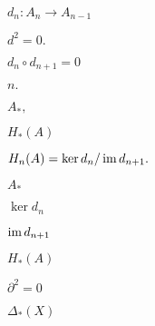 \documentclass[10pt]{book}
\begin{document}
\begin{mdSnippets}
\begin{mdInlineSnippet}[11b6688f633f1839d91ea2501f3293c0]%
$d_n: A_n \to A_{n-1}$\end{mdInlineSnippet}%
\begin{mdInlineSnippet}[a630ae745659559adf449bf608149147]%
$d^2 = 0.$\end{mdInlineSnippet}%
\begin{mdInlineSnippet}[27178de89c53d06da7205800993e6232]%
$d_n \circ d_{n+1} = 0$\end{mdInlineSnippet}%
\begin{mdInlineSnippet}[36cb6ed5283e452800c275dd6934aecc]%
$n.$\end{mdInlineSnippet}%
\begin{mdInlineSnippet}%
$A_*,$\end{mdInlineSnippet}%
\begin{mdInlineSnippet}[a39f07818df5450f4892bfb83a9c660d]%
$H_*(A)$\end{mdInlineSnippet}%
\begin{mdInlineSnippet}[a19203b46a635600ae68ff48045cd88e]%
$H_n(A) = \ker d_n / \operatorname{im} d_{n+1}.$\end{mdInlineSnippet}%
\begin{mdInlineSnippet}[bfb8158d29b977d384fd028bb66c6290]%
$A_*$\end{mdInlineSnippet}%
\begin{mdInlineSnippet}%
$\ker d_n$\end{mdInlineSnippet}%
\begin{mdInlineSnippet}[5ee8a4d278b83d41842506c4d6faf132]%
$\operatorname{im} d_{n+1}$\end{mdInlineSnippet}%
\begin{mdInlineSnippet}[a39f07818df5450f4892bfb83a9c660d]%
$H_*(A)$\end{mdInlineSnippet}%
\begin{mdInlineSnippet}[3ffcd86d6a26df8410ee6347d228fa17]%
$\partial^2 = 0$\end{mdInlineSnippet}%
\begin{mdInlineSnippet}[c61c1f5a0477f12628e1bcd5842fc71f]%
$\Delta_*(X)$\end{mdInlineSnippet}%

\end{mdSnippets}
\end{document}
